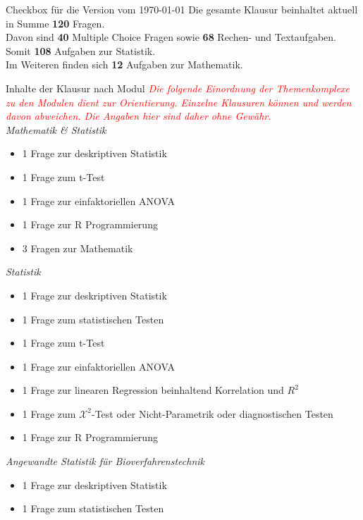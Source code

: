 \documentclass[a4paper, 10pt]{scrartcl}\usepackage[]{graphicx}\usepackage[]{xcolor}
\begin{document}

\begin{graybox}{Checkbox für die Version vom \today}
  \Large Die gesamte Klausur beinhaltet aktuell in Summe
  \textbf{120}
  Fragen.\\[1Ex]
  Davon sind \textbf{40} Multiple
  Choice Fragen sowie \textbf{68} Rechen- und
  Textaufgaben. Somit \textbf{108} Aufgaben zur Statistik.\\[1Ex]
  Im Weiteren finden sich \textbf{12} Aufgaben zur Mathematik.
\end{graybox}

\newpage  
    
\begin{graybox}{Inhalte der Klausur nach Modul}  
  \small
  \textcolor{red}{\textit{Die folgende Einordnung der Themenkomplexe zu den Modulen dient zur Orientierung. Einzelne Klausuren können und werden davon abweichen. Die Angaben hier sind daher ohne Gewähr.}}\\[1Ex]
  \textit{Mathematik \& Statistik} 
  \begin{itemize}
  \item 1 Frage zur deskriptiven Statistik
  \item 1 Frage zum t-Test
  \item 1 Frage zur einfaktoriellen ANOVA
  \item 1 Frage zur R Programmierung
  \item 3 Fragen zur Mathematik
  \end{itemize} 
  \textit{Statistik} 
  \begin{itemize}
  \item 1 Frage zur deskriptiven Statistik
  \item 1 Frage zum statistischen Testen
  \item 1 Frage zum t-Test
  \item 1 Frage zur einfaktoriellen ANOVA
  \item 1 Frage zur linearen Regression beinhaltend Korrelation und $R^2$
  \item 1 Frage zum $\mathcal{X}^2$-Test oder Nicht-Parametrik oder diagnostischen Testen
  \item 1 Frage zur R Programmierung
  \end{itemize} 
  \textit{Angewandte Statistik für Bioverfahrenstechnik } 
  \begin{itemize}
  \item 1 Frage zur deskriptiven Statistik
  \item 1 Frage zum statistischen Testen

\end{itemize}
\end{graybox}
\end{document}
